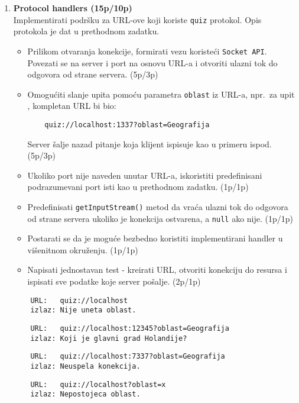 \documentclass[]{article}
\begin{document}
\begin{enumerate}
\item \textbf{Protocol handlers (15p/10p)}
\\Implementirati podr\v{s}ku za URL-ove koji koriste \texttt{quiz} protokol. Opis protokola je dat u prethodnom zadatku. 
\begin{itemize}
  \item Prilikom otvaranja konekcije, formirati vezu koriste\'c{}i \texttt{Socket API}. Povezati se na server i port na osnovu URL-a i otvoriti ulazni tok do odgovora od strane servera. \hfill (5p/3p)
  \item Omogu\'c{}iti slanje upita pomo\'c{}u parametra \texttt{oblast} iz URL-a, npr.~za upit \texttt{}, kompletan URL bi bio:
  \begin{lstlisting}
    quiz://localhost:1337?oblast=Geografija
  \end{lstlisting}
  Server \v{s}alje nazad pitanje koja klijent ispisuje kao u primeru ispod. \hfill (5p/3p)
  \item Ukoliko port nije naveden unutar URL-a, iskoristiti predefinisani podrazumevani port isti kao u prethodnom zadatku. \hfill (1p/1p)
  \item Predefinisati \texttt{getInputStream()} metod da vra\'c{}a ulazni tok do odgovora od strane servera ukoliko je konekcija ostvarena, a \texttt{null} ako nije. \hfill (1p/1p)
  \item Postarati se da je mogu\'c{}e bezbedno koristiti implementirani handler u vi\v{s}enitnom okru\v{z}enju. \hfill (1p/1p)
  \item Napisati jednostavan test - kreirati URL, otvoriti konekciju do resursa i ispisati sve podatke koje server po\v{s}alje. \hfill (2p/1p)
\end{itemize}

\vspace{10pt}
\noindent
  \begin{lstlisting}
    URL:   quiz://localhost
    izlaz: Nije uneta oblast.
  \end{lstlisting}
  \begin{lstlisting}
    URL:   quiz://localhost:12345?oblast=Geografija
    izlaz: Koji je glavni grad Holandije?
  \end{lstlisting}
  \begin{lstlisting}
    URL:   quiz://localhost:7337?oblast=Geografija
    izlaz: Neuspela konekcija.
  \end{lstlisting}
  \begin{lstlisting}
    URL:   quiz://localhost?oblast=x
    izlaz: Nepostojeca oblast.
  \end{lstlisting}

\end{enumerate}
\end{document}

